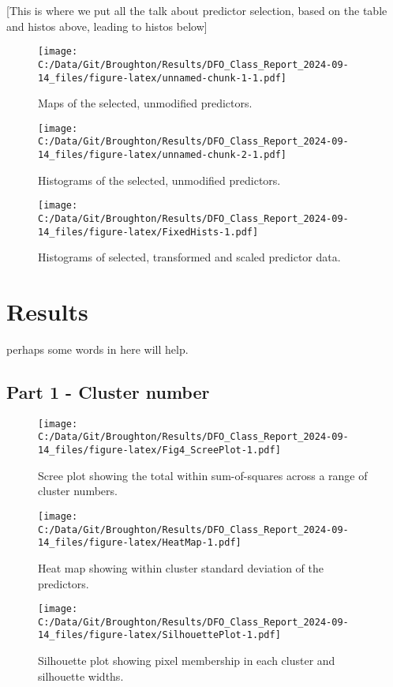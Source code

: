 \documentclass[
  11pt,
]{article}
\begin{document}
{[}This is where we put all the talk about predictor selection, based on
the table and histos above, leading to histos below{]}

\begin{figure}
\centering
\texttt{[image: C:/Data/Git/Broughton/Results/DFO\_Class\_Report\_2024-09-14\_files/figure-latex/unnamed-chunk-1-1.pdf]}
\caption{Maps of the selected, unmodified predictors.}
\end{figure}

\begin{figure}
\centering
\texttt{[image: C:/Data/Git/Broughton/Results/DFO\_Class\_Report\_2024-09-14\_files/figure-latex/unnamed-chunk-2-1.pdf]}
\caption{Histograms of the selected, unmodified predictors.}
\end{figure}

\begin{figure}
\centering
\texttt{[image: C:/Data/Git/Broughton/Results/DFO\_Class\_Report\_2024-09-14\_files/figure-latex/FixedHists-1.pdf]}
\caption{Histograms of selected, transformed and scaled predictor data.}
\end{figure}

\hypertarget{results}{%
\section{Results}\label{results}}

perhaps some words in here will help.

\hypertarget{part-1---cluster-number}{%
\subsection{Part 1 - Cluster number}\label{part-1---cluster-number}}

\begin{figure}
\centering
\texttt{[image: C:/Data/Git/Broughton/Results/DFO\_Class\_Report\_2024-09-14\_files/figure-latex/Fig4\_ScreePlot-1.pdf]}
\caption{Scree plot showing the total within sum-of-squares across a
range of cluster numbers.}
\end{figure}

\begin{figure}
\centering
\texttt{[image: C:/Data/Git/Broughton/Results/DFO\_Class\_Report\_2024-09-14\_files/figure-latex/HeatMap-1.pdf]}
\caption{Heat map showing within cluster standard deviation of the
predictors.}
\end{figure}

\begin{figure}
\centering
\texttt{[image: C:/Data/Git/Broughton/Results/DFO\_Class\_Report\_2024-09-14\_files/figure-latex/SilhouettePlot-1.pdf]}
\caption{Silhouette plot showing pixel membership in each cluster and
silhouette widths.}
\end{figure}
\end{document}
